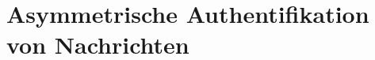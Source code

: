 \section{Asymmetrische Authentifikation von Nachrichten}%
\label{asauth:sec:asymmetrische_authentifikation_von_nachrichten}

